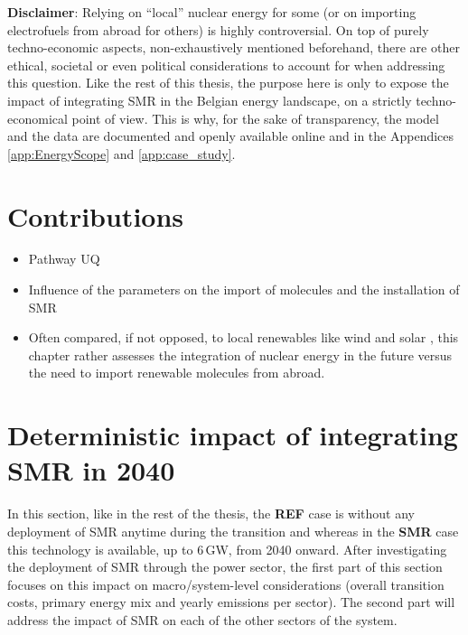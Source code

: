 \textbf{Disclaimer}: Relying on ``local'' nuclear energy for some (or on importing electrofuels from abroad for others) is highly controversial. On top of purely techno-economic aspects, non-exhaustively mentioned beforehand, there are other ethical, societal or even political considerations to account for when addressing this question. Like the rest of this thesis, the purpose here is only to expose the impact of integrating \gls{SMR} in the Belgian energy landscape, on a strictly techno-economical point of view. This is why, for the sake of transparency, the model and the data are documented and openly available online \cite{readthedocs_pathway} and in the Appendices \ref{app:EnergyScope} and \ref{app:case_study}.

\section*{Contributions}
\label{sec:atom_mol:contributions}
\begin{itemize}
\item Pathway UQ
\item Influence of the parameters on the import of molecules and the installation of SMR

\item Often compared, if not opposed, to local renewables like wind and solar \cite{suna2016nuclear,khatib2016economics}, this chapter rather assesses the integration of nuclear energy in the future versus the need to import renewable molecules from abroad. 

\end{itemize}

\section{Deterministic impact of integrating \gls{SMR} in 2040}
\label{sec:atom_mol:results_deter} 
In this section, like in the rest of the thesis, the \textbf{REF} case is without any deployment of \gls{SMR} anytime during the transition and whereas in the \textbf{SMR} case this technology is available, up to 6\,GW, from 2040 onward. After investigating the deployment of \gls{SMR} through the power sector, the first part of this section focuses on this impact on macro/system-level considerations (\ie overall transition costs, primary energy mix and yearly emissions per sector). The second part will address the impact of \gls{SMR} on each of the other sectors of the system.

